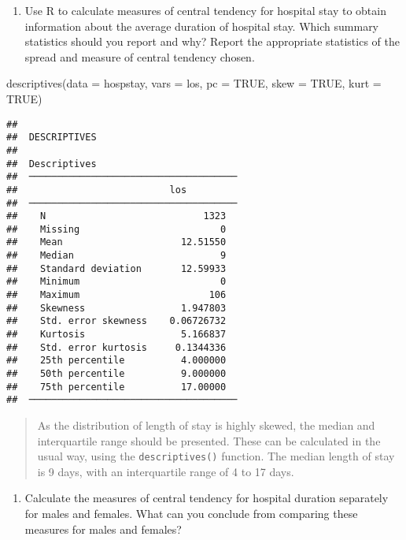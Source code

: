 \documentclass[
]{memoir}
\newenvironment{Shaded}{\begin{snugshade}}{\end{snugshade}}
\newcommand{\AttributeTok}[1]{\textcolor[rgb]{0.77,0.63,0.00}{#1}}
\newcommand{\ConstantTok}[1]{\textcolor[rgb]{0.00,0.00,0.00}{#1}}
\newcommand{\FunctionTok}[1]{\textcolor[rgb]{0.00,0.00,0.00}{#1}}
\newcommand{\NormalTok}[1]{#1}
\providecommand{\tightlist}{%
  \setlength{\itemsep}{0pt}\setlength{\parskip}{0pt}}
\begin{document}
\begin{enumerate}
\def\labelenumi{\alph{enumi})}
\setcounter{enumi}{1}
\tightlist
\item
  Use R to calculate measures of central tendency for hospital stay to obtain information about the average duration of hospital stay. Which summary statistics should you report and why? Report the appropriate statistics of the spread and measure of central tendency chosen.
\end{enumerate}

\begin{Shaded}
\begin{Highlighting}[]
\FunctionTok{descriptives}\NormalTok{(}\AttributeTok{data =}\NormalTok{ hospstay,}
             \AttributeTok{vars =}\NormalTok{ los,}
             \AttributeTok{pc =} \ConstantTok{TRUE}\NormalTok{,}
             \AttributeTok{skew =} \ConstantTok{TRUE}\NormalTok{,}
             \AttributeTok{kurt =} \ConstantTok{TRUE}\NormalTok{)}
\end{Highlighting}
\end{Shaded}

\begin{verbatim}
## 
##  DESCRIPTIVES
## 
##  Descriptives                          
##  ───────────────────────────────────── 
##                           los          
##  ───────────────────────────────────── 
##    N                            1323   
##    Missing                         0   
##    Mean                     12.51550   
##    Median                          9   
##    Standard deviation       12.59933   
##    Minimum                         0   
##    Maximum                       106   
##    Skewness                 1.947803   
##    Std. error skewness    0.06726732   
##    Kurtosis                 5.166837   
##    Std. error kurtosis     0.1344336   
##    25th percentile          4.000000   
##    50th percentile          9.000000   
##    75th percentile          17.00000   
##  ─────────────────────────────────────
\end{verbatim}

\begin{quote}
As the distribution of length of stay is highly skewed, the median and interquartile range should be presented. These can be calculated in the usual way, using the \texttt{descriptives()} function. The median length of stay is 9 days, with an interquartile range of 4 to 17 days.
\end{quote}

\begin{enumerate}
\def\labelenumi{\alph{enumi})}
\setcounter{enumi}{2}
\tightlist
\item
  Calculate the measures of central tendency for hospital duration separately for males and females. What can you conclude from comparing these measures for males and females?
\end{enumerate}
\end{document}
